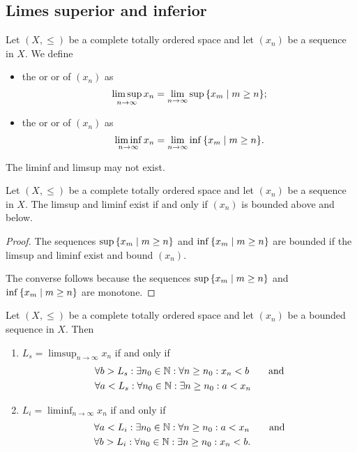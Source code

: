 \subsection{Limes superior and inferior}
\begin{definition}
Let $(X,\leq)$ be a complete totally ordered space and let $(x_n)$ be a sequence in $X$. We define
\begin{itemize}
\item the  or  or  of $(x_n)$ as
\[ \limsup_{n\to\infty} x_n = \lim_{n\to \infty} \sup\setbuilder{x_m}{m\geq n}; \]
\item the  or  or  of $(x_n)$ as
\[ \liminf_{n\to\infty} x_n = \lim_{n\to \infty} \inf\setbuilder{x_m}{m\geq n}. \]
\end{itemize}
\end{definition}
The liminf and limsup may not exist.
\begin{lemma}
Let $(X,\leq)$ be a complete totally ordered space and let $(x_n)$ be a sequence in $X$. The limsup and liminf exist \textup{if and only if}  $(x_n)$ is bounded above and below.
\end{lemma}
\begin{proof}
The sequences $\sup\setbuilder{x_m}{m\geq n}$ and $\inf\setbuilder{x_m}{m\geq n}$ are bounded if the limsup and liminf exist and bound $(x_n)$.

The converse follows because the sequences $\sup\setbuilder{x_m}{m\geq n}$ and $\inf\setbuilder{x_m}{m\geq n}$ are monotone.
\end{proof}

\begin{proposition} \label{characterisationLimsupLiminf}
Let $(X,\leq)$ be a complete totally ordered space and let $(x_n)$ be a bounded sequence in $X$. Then 
\begin{enumerate}
\item $L_s = \limsup_{n\to\infty} x_n$ \textup{if and only if}
\begin{align*}
&\forall b > L_s: \exists n_0\in \mathbb{N}:\forall n\geq n_0: x_n < b \qquad \text{and} \\
&\forall a < L_s: \forall n_0\in \mathbb{N}:\exists n\geq n_0: a < x_n
\end{align*}
\item $L_i = \liminf_{n\to\infty} x_n$ \textup{if and only if}
\begin{align*}
&\forall a < L_i: \exists n_0\in \mathbb{N}:\forall n\geq n_0: a < x_n \qquad \text{and} \\
&\forall b > L_i: \forall n_0\in \mathbb{N}:\exists n\geq n_0: x_n < b.
\end{align*}
\end{enumerate}
\end{proposition}

